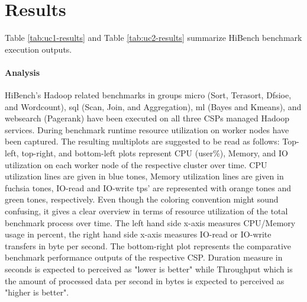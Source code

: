 \documentclass[review]{elsarticle}
\begin{document}
\section{Results}
Table \ref{tab:uc1-results} and Table \ref{tab:uc2-results} summarize HiBench benchmark execution outputs.
\paragraph{Analysis}HiBench's Hadoop related benchmarks in groups micro (Sort, Terasort, Dfsioe, and Wordcount), sql (Scan, Join, and Aggregation), ml (Bayes and Kmeans), and websearch (Pagerank) have been executed on all three CSPs managed Hadoop services. During benchmark runtime resource utilization on worker nodes have been captured. The resulting multiplots are suggested to be read as follows: Top-left, top-right, and bottom-left plots represent CPU (user\%), Memory, and IO utilization on each worker node of the respective cluster over time. CPU utilization lines are given in blue tones, Memory utilization lines are given in fuchsia tones, IO-read and IO-write tps' are represented with orange tones and green tones, respectively. Even though the coloring convention might sound confusing, it gives a clear overview in terms of resource utilization of the total benchmark process over time. The left hand side x-axis measures CPU/Memory usage in percent, the right hand side x-axis measures IO-read or IO-write transfers in byte per second. The bottom-right plot represents the comparative benchmark performance outputs of the respective CSP. Duration measure in seconds is expected to perceived as "lower is better" while Throughput which is the amount of processed data per second in bytes is expected to perceived as "higher is better".
\end{document}
